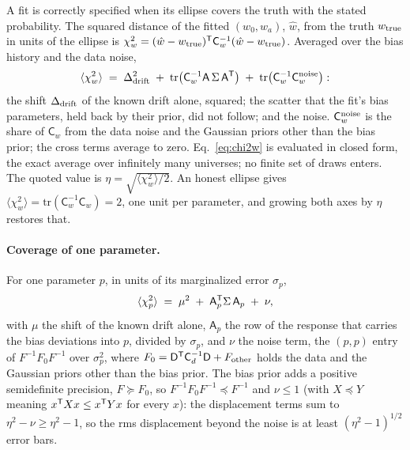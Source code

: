 A fit is correctly specified when its ellipse covers the truth with
the stated probability.  The squared distance of the fitted
$(w_0, w_a)$, $\hat{w}$, from the truth $w_{\rm true}$ in units of the
ellipse is
$\chi^2_w = (\hat{w} - w_{\rm true})^{\mathsf{T}} \mathsf{C}_w^{-1}
(\hat{w} - w_{\rm true})$.  Averaged over the bias history and the
data noise,
\begin{equation}
  \langle \chi^2_w \rangle
  \;=\;
  \Delta_{\rm drift}^2
  \;+\;
  \mathrm{tr}\!\left(\mathsf{C}_w^{-1} \mathsf{A}\,\Sigma\,\mathsf{A}^{\mathsf{T}}\right)
  \;+\;
  \mathrm{tr}\!\left(\mathsf{C}_w^{-1} \mathsf{C}_w^{\rm noise}\right):
  \label{eq:chi2w}
\end{equation}
the shift $\Delta_{\rm drift}$ of the known drift alone, squared; the
scatter that the fit's bias parameters, held back by their prior, did
not follow; and the noise.  $\mathsf{C}_w^{\rm noise}$ is the share of
$\mathsf{C}_w$ from the data noise and the Gaussian priors other than
the bias prior; the cross terms average to zero.  Eq.~\eqref{eq:chi2w}
is evaluated in closed form, the exact average over infinitely many
universes; no finite set of draws enters.  The quoted value is
$\eta = \sqrt{\langle \chi^2_w \rangle/2}$.  An honest ellipse gives
$\langle \chi^2_w \rangle = \mathrm{tr}(\mathsf{C}_w^{-1}\mathsf{C}_w)
= 2$, one unit per parameter, and growing both axes by $\eta$ restores
that.

\paragraph{Coverage of one parameter.}
For one parameter $p$, in units of its marginalized error $\sigma_p$,
\begin{equation}
  \langle \chi^2_p \rangle \;=\; \mu^2 \;+\; \mathsf{A}_p^{\mathsf{T}} \Sigma\, \mathsf{A}_p \;+\; \nu ,
  \label{eq:chi2p}
\end{equation}
with $\mu$ the shift of the known drift alone, $\mathsf{A}_p$ the row
of the response that carries the bias deviations into $p$, divided by
$\sigma_p$, and $\nu$ the noise term, the $(p, p)$ entry of
$F^{-1}F_0F^{-1}$ over $\sigma_p^2$, where
$F_0 = \mathsf{D}^{\mathsf{T}}\mathsf{C}_d^{-1}\mathsf{D} + F_{\rm other}$ holds the
data and the Gaussian priors other than the bias prior.  The bias
prior adds a positive semidefinite precision, $F \succeq F_0$, so
$F^{-1}F_0F^{-1} \preceq F^{-1}$ and $\nu \le 1$ (with $X \preceq Y$
meaning $x^{\mathsf{T}} X x \le x^{\mathsf{T}} Y x$ for every $x$): the displacement terms
sum to $\eta^2 - \nu \ge \eta^2 - 1$, so the rms displacement
beyond the noise is at least $(\eta^2 - 1)^{1/2}$ error bars.

